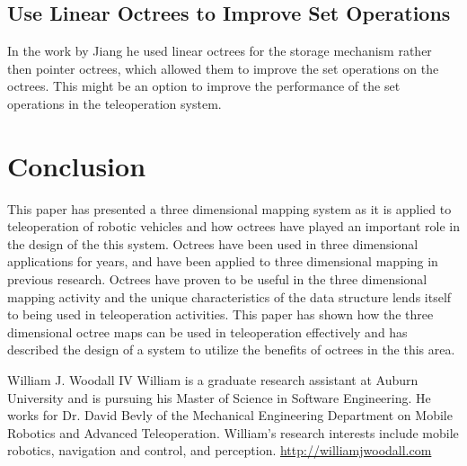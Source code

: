 \documentclass[journal]{IEEEtran}
\begin{document}
  \subsection{Use Linear Octrees to Improve Set Operations}
  In the work by Jiang he used linear octrees for the storage mechanism rather
  then pointer octrees, which allowed them to improve the set operations on
  the octrees.\cite{jiang1996set} This might be an option to improve the
  performance of the set operations in the teleoperation system.
  
  \section{Conclusion}
  This paper has presented a three dimensional mapping system as it is applied
  to teleoperation of robotic vehicles and how octrees have played an
  important role in the design of the this system. Octrees have been used in
  three dimensional applications for years, and have been applied to three
  dimensional mapping in previous research. Octrees have proven to be useful
  in the three dimensional mapping activity and the unique characteristics of
  the data structure lends itself to being used in teleoperation activities.
  This paper has shown how the three dimensional octree maps can be used in
  teleoperation effectively and has described the design of a system to
  utilize the benefits of octrees in the this area.
  
  \newpage
  
  
  
  
  \begin{IEEEbiography}
    {William J. Woodall IV}
      William is a graduate research assistant at Auburn University and is
      pursuing his Master of Science in Software Engineering. He works for Dr.
      David Bevly of the Mechanical Engineering Department on Mobile Robotics
      and Advanced Teleoperation. William's research interests include mobile
      robotics, navigation and control, and perception.
  \url{http://williamjwoodall.com}
  \end{IEEEbiography}
  
\end{document}

